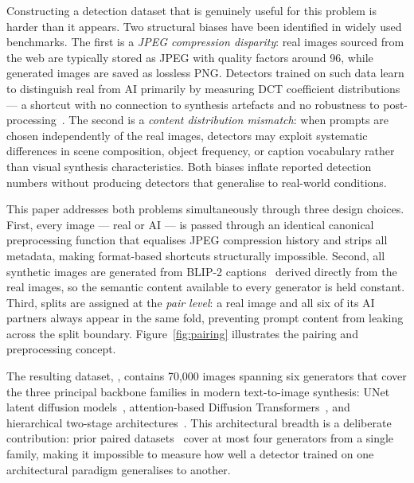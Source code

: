 Constructing a detection dataset that is genuinely useful for this
problem is harder than it appears.
Two structural biases have been identified in widely used benchmarks.
The first is a \emph{JPEG compression disparity}: real images sourced
from the web are typically stored as JPEG with quality factors around
96, while generated images are saved as lossless PNG.
Detectors trained on such data learn to distinguish real from AI
primarily by measuring DCT coefficient distributions --- a shortcut
with no connection to synthesis artefacts and no robustness to
post-processing~\cite{grommelt2024jpeg}.
The second is a \emph{content distribution mismatch}: when prompts are
chosen independently of the real images, detectors may exploit
systematic differences in scene composition, object frequency, or
caption vocabulary rather than visual synthesis characteristics.
Both biases inflate reported detection numbers without producing
detectors that generalise to real-world conditions.

This paper addresses both problems simultaneously through three
design choices.
First, every image --- real or AI --- is passed through an identical
canonical preprocessing function that equalises JPEG compression
history and strips all metadata, making format-based shortcuts
structurally impossible.
Second, all synthetic images are generated from BLIP-2
captions~\cite{li2023blip2} derived directly from the real images,
so the semantic content available to every generator is held constant.
Third, splits are assigned at the \emph{pair level}: a real image and
all six of its AI partners always appear in the same fold, preventing
prompt content from leaking across the split boundary.
Figure~\ref{fig:pairing} illustrates the pairing and preprocessing
concept.

The resulting dataset, \textbf{\datasetname}, contains 70,000 images
spanning six generators that cover the three principal backbone
families in modern text-to-image synthesis: UNet latent diffusion
models~\cite{rombach2022ldm,podell2024sdxl}, attention-based Diffusion
Transformers~\cite{chen2024pixart}, and hierarchical two-stage
architectures~\cite{razzhigaev2023kandinsky,pernias2023wuerstchen}.
This architectural breadth is a deliberate contribution: prior paired
datasets~\cite{jiang2024passive} cover at most four generators from
a single family, making it impossible to measure how well a detector
trained on one architectural paradigm generalises to another.

